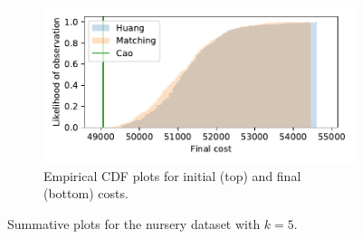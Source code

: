 \documentclass[11pt]{article}
\begin{document}
\begin{figure}
\begin{subfigure}{.5\textwidth}
        \includegraphics[width=\linewidth]{Fig7b2.pdf}
        \caption{Empirical CDF plots for initial (top) and final (bottom)
                 costs.}
    \end{subfigure}
    \caption{Summative plots for the nursery dataset with \(k=5\).}%
    \label{fig:nursery_nclasses}
\end{figure}
\end{document}
